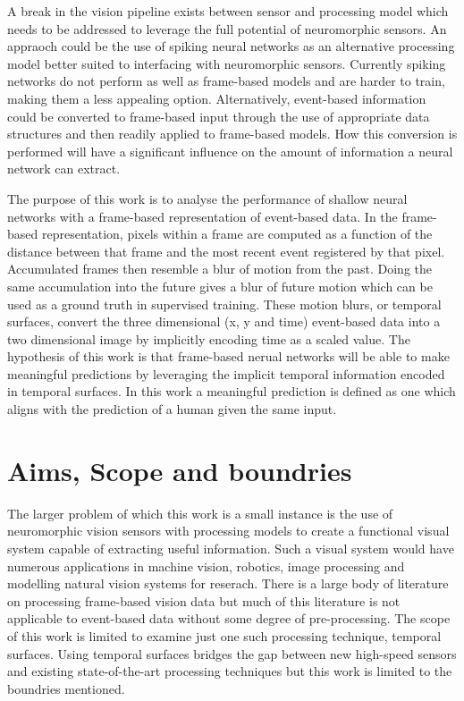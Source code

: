 A break in the vision pipeline exists between sensor and processing model which needs to be addressed to leverage the full potential of neuromorphic sensors. 
An appraoch could be the use of spiking neural networks as an alternative processing model better suited to interfacing with neuromorphic sensors.
Currently spiking networks do not perform as well as frame-based models and are harder to train, making them a less appealing option.
Alternatively, event-based information could be converted to frame-based input through the use of appropriate data structures and then readily applied to frame-based models. 
How this conversion is performed will have a significant influence on the amount of information a neural network can extract.

The purpose of this work is to analyse the performance of shallow neural networks with a frame-based representation of event-based data.
In the frame-based representation, pixels within a frame are computed as a function of the distance between that frame and the most recent event registered by that pixel. 
Accumulated frames then resemble a blur of motion from the past. 
Doing the same accumulation into the future gives a blur of future motion which can be used as a ground truth in supervised training.
These motion blurs, or temporal surfaces, convert the three dimensional (x, y and time) event-based data into a two dimensional image by implicitly encoding time as a scaled value.
The hypothesis of this work is that frame-based nerual networks will be able to make meaningful predictions by leveraging the implicit temporal information encoded in temporal surfaces. 
In this work a meaningful prediction is defined as one which aligns with the prediction of a human given the same input.  


\section{Aims, Scope and boundries}
The larger problem of which this work is a small instance is the use of neuromorphic vision sensors with processing models to create a functional visual system capable of extracting useful information. 
Such a visual system would have numerous applications in machine vision, robotics, image processing and modelling natural vision systems for reserach. 
There is a large body of literature on processing frame-based vision data but much of this literature is not applicable to event-based data without some degree of pre-processing. 
The scope of this work is limited to examine just one such processing technique, temporal surfaces.
Using temporal surfaces bridges the gap between new high-speed sensors and existing state-of-the-art processing techniques but this work is limited to the boundries mentioned.

